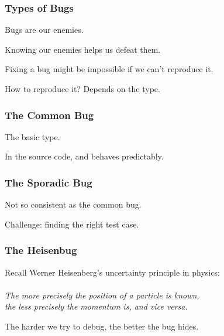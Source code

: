 \begin{frame}
\frametitle{Types of Bugs}
\begin{changemargin}{1cm}
Bugs are our enemies.

Knowing our enemies helps us defeat them.

Fixing a bug might be impossible if we can't \alert{reproduce} it.

How to reproduce it? Depends on the type.
\end{changemargin}
\end{frame}

\begin{frame}
\frametitle{The Common Bug}
\begin{changemargin}{1cm}
The basic type.

In the source code, and behaves predictably.

\end{changemargin}
\end{frame}

\begin{frame}
\frametitle{The Sporadic Bug}
\begin{changemargin}{1cm}
Not so consistent as the common bug. 

Challenge: finding the right test case.


\end{changemargin}
\end{frame}

\begin{frame}
\frametitle{The Heisenbug}
\begin{changemargin}{1cm}

Recall Werner Heisenberg's uncertainty principle in physics:\\~\\
\quad \textit{The more precisely the position of a particle is known,\\
\quad the less precisely the momentum is, and vice versa.}

The harder we try to debug, the better the bug hides. 

\end{changemargin}
\end{frame}

